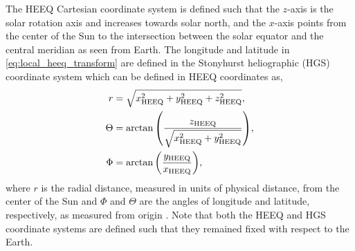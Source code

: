 The HEEQ Cartesian coordinate system is defined such that the $z$-axis is the solar rotation axis and increases towards solar north, and the $x$-axis points from the center of the Sun to the intersection between the solar equator and the central meridian as seen from Earth. The longitude and latitude in \autoref{eq:local_heeq_transform} are defined in the Stonyhurst heliographic (HGS) coordinate system which can be defined in HEEQ coordinates as,
\begin{align}\label{eq:heeq_hgs_transform}
    r &= \sqrt{x^2_\textup{HEEQ} + y^2_\textup{HEEQ} + z^2_\textup{HEEQ}}, \\
    \Theta &= \arctan{\left(\frac{z_\textup{HEEQ}}{\sqrt{x^2_\textup{HEEQ} + y^2_\textup{HEEQ}}}\right)}, \\
    \Phi &= \arctan{\left(\frac{y_\textup{HEEQ}}{x_\textup{HEEQ}}\right)},
\end{align}
where $r$ is the radial distance, measured in units of physical distance, from the center of the Sun and $\Phi$ and $\Theta$ are the angles of longitude and latitude, respectively, as measured from origin \citep{thompson_coordinate_2006}. Note that both the HEEQ and HGS coordinate systems are defined such that they remained fixed with respect to the Earth.

